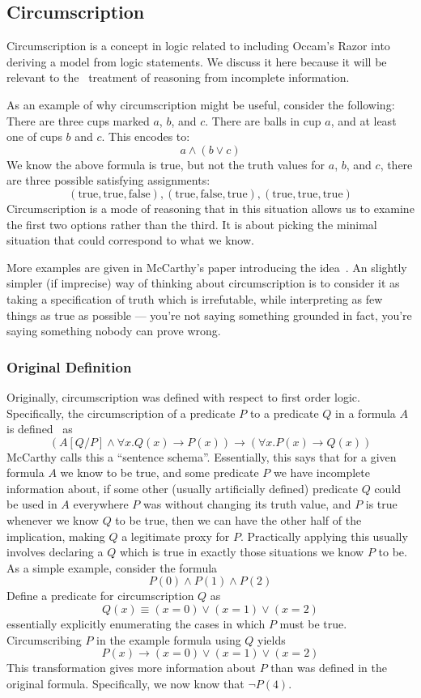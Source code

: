 \subsection{Circumscription}
\label{sec:circumscription}
Circumscription is a concept in logic related to including Occam's Razor into deriving a model from logic statements.
We discuss it here because it will be relevant to the \sysname\ treatment of reasoning from incomplete information.

\newcommand{\true}{\textrm{true}}
\newcommand{\false}{\textrm{false}}
As an example of why circumscription might be useful, consider the following:
There are three cups marked $a$, $b$, and $c$.
There are balls in cup $a$, and at least one of cups $b$ and $c$.
This encodes to:
\[a \wedge (b \vee c)\]
We know the above formula is true, but not the truth values for $a$, $b$, and $c$, there are three possible satisfying assignments:
\[
        (\true, \true, \false), (\true, \false, \true), (\true, \true, \true)
\]
Circumscription is a mode of reasoning that in this situation allows us to examine the first two options rather than the third.
It is about picking the minimal situation that could correspond to what we know.

More examples are given in McCarthy's paper introducing the idea~\cite{circumscription}.
An slightly simpler (if imprecise) way of thinking about circumscription is to consider it as taking a specification of truth which is irrefutable, while interpreting as few things as true as possible --- you're not saying something grounded in fact, you're saying something nobody can prove wrong.
\subsubsection{Original Definition}
Originally, circumscription was defined with respect to first order logic.
Specifically, the circumscription of a predicate $P$ to a predicate $Q$ in a formula $A$ is defined~\cite{circumscription} as
\[
(A [Q/P] \wedge \forall x. Q(x) \rightarrow P(x)) \rightarrow (\forall x. P(x) \rightarrow Q(x))
\]
McCarthy calls this a ``sentence schema''.
Essentially, this says that for a given formula $A$ we know to be true, and some predicate $P$ we have incomplete information about, if some other (usually artificially defined) predicate $Q$ could be used in $A$ everywhere $P$ was without changing its truth value, and $P$ is true whenever we know $Q$ to be true, then we can have the other half of the implication, making $Q$ a legitimate proxy for $P$.
Practically applying this usually involves declaring a $Q$ which is true in exactly those situations we know $P$ to be.
As a simple example, consider the formula
\[
        P(0) \wedge P(1) \wedge P(2)
\]
Define a predicate for circumscription $Q$ as
\[
        Q(x) \equiv (x = 0) \vee (x = 1) \vee (x = 2)
\]
essentially explicitly enumerating the cases in which $P$ must be true.
Circumscribing $P$ in the example formula using $Q$ yields
\[
        P(x) \rightarrow (x = 0) \vee (x = 1) \vee (x = 2)
\]
This transformation gives more information about $P$ than was defined in the original formula.
Specifically, we now know that $\neg P(4)$.

